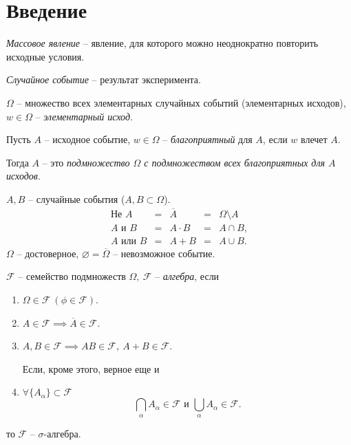 

\setcounter{section}{-1}
\section{Введение}

\emph{Массовое явление} -- явление, для которого можно неоднократно повторить исходные условия.

\emph{Случайное событие} -- результат эксперимента.
\begin{figure}[H]
  \centering
  \label{fig:fig-1}
\end{figure}

$\Omega$ -- множество всех элементарных случайных событий (элементарных исходов), $w \in \Omega$ -- \emph{элементарный исход}.

\begin{definition}
  Пусть $A$ -- исходное событие, $w \in \Omega$ -- \emph{благоприятный} для $A$, если $w$ влечет $A$.

  Тогда $A$ -- это \emph{подмножество $\Omega$ с подмножеством всех благоприятных для $A$ исходов}.
\end{definition}

\begin{note}
  $A,B$ -- случайные события ($A,B \subset \Omega$).
  \[
    \begin{array}{ccccc}
      \text{Не } A & = & \overline{A} & = & \Omega \setminus A \\
      A \text{ и } B & = & A \cdot B & = & A \cap B, \\
      A \text{ или } B & = & A + B & = & A \cup B.
    \end{array} 
  \]
  $\Omega$ -- достоверное, $\varnothing = \overline{\Omega}$ -- невозможное событие.
\end{note}

\begin{definition}[Алгебра]
  $\mathcal{F}$ -- семейство подмножеств $\Omega, \ \mathcal{F}$ -- \emph{алгебра}, если 
  \begin{enumerate}
    \item $\Omega \in \mathcal{F} \ (\phi \in \mathcal{F})$.
    \item $A \in \mathcal{F}\implies \overline{A} \in \mathcal{F}$.
    \item $A,B \in \mathcal{F}\implies AB \in \mathcal{F}, \ A+B\in \mathcal{F}$.

    Если, кроме этого, верное еще и
    \item $\forall \{A_{\alpha}\}\subset \mathcal{F}$
    \[
      \bigcap_{\alpha}A_{\alpha}\in \mathcal{F} \text{ и } \bigcup_{\alpha}A_{\alpha}\in \mathcal{F}.
    \]
  \end{enumerate}
  то $\mathcal{F}$ -- $\sigma$-алгебра.
\end{definition}

